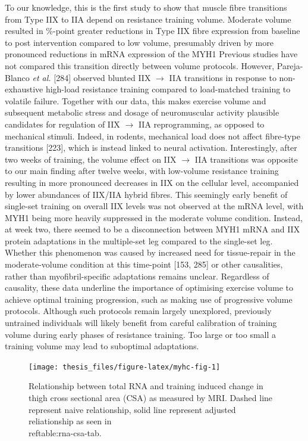 \documentclass[twoside,10pt]{gihclass} %
\begin{document}
To our knowledge, this is the first study to show that muscle fibre transitions from Type IIX to IIA depend on resistance training volume. Moderate volume resulted in \%-point greater reductions in Type IIX fibre expression from baseline to post intervention compared to low volume, presumably driven by more pronounced reductions in mRNA expression of the MYH1
Previous studies have not compared this transition directly between volume protocols. However, Pareja-Blanco \emph{et al.} {[}284{]} observed blunted IIX \(\rightarrow\) IIA transitions in response to non-exhaustive high-load resistance training compared to load-matched training to volatile failure. Together with our data, this makes exercise volume and subsequent metabolic stress and dosage of neuromuscular activity plausible candidates for regulation of IIX \(\rightarrow\) IIA reprogramming, as opposed to mechanical stimuli.
Indeed, in rodents, mechanical load does not affect fibre-type transitions
{[}223{]}, which is instead linked to neural activation. Interestingly, after two weeks of training, the volume effect on IIX \(\rightarrow\) IIA transitions was opposite to our main finding after twelve weeks, with low-volume resistance training resulting in more pronounced decreases in IIX on the cellular level, accompanied by lower abundances of IIX/IIA hybrid fibres. This seemingly early benefit of single-set training on overall IIX levels was not observed at the mRNA level, with MYH1 being more heavily suppressed in the moderate volume condition. Instead, at week two, there seemed to be a disconnection between MYH1 mRNA and IIX protein adaptations in the multiple-set leg compared to the single-set leg. Whether this phenomenon was caused by increased need for tissue-repair in the moderate-volume condition at this time-point
{[}153, 285{]}
or other causalities, rather than myofibril-specific adaptations remains unclear. Regardless of causality, these data underline the importance of optimising exercise volume to achieve optimal training progression, such as making use of progressive volume protocols. Although such protocols remain largely unexplored, previously untrained individuals will likely benefit from careful calibration of training volume during early phases of resistance training. Too large or too small a training volume may lead to suboptimal adaptations.

\pagebreak
\begin{figure}

{\centering \texttt{[image: thesis\_files/figure-latex/myhc-fig-1]} 

}

\caption[Relationship between total RNA and training induced muscle growth]{Relationship between total RNA and training induced change in thigh cross sectional area (CSA) as measured by MRI. Dashed line represent naive relationship, solid line represent adjusted reliationship as seen in \\ref{table:rna-csa-tab}.}\label{fig:myhc-fig}
\end{figure}
\pagebreak
\end{document}
